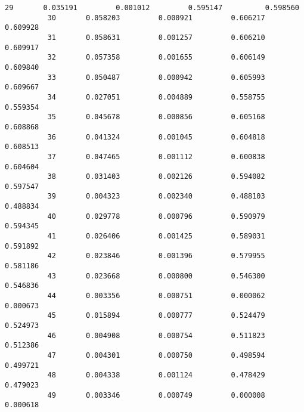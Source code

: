 \documentclass[11pt]{article}
\begin{document}
\begin{Verbatim}[commandchars=\\\{\}]
          29       0.035191         0.001012         0.595147          0.598560   
          30       0.058203         0.000921         0.606217          0.609928   
          31       0.058631         0.001257         0.606210          0.609917   
          32       0.057358         0.001655         0.606149          0.609840   
          33       0.050487         0.000942         0.605993          0.609667   
          34       0.027051         0.004889         0.558755          0.559354   
          35       0.045678         0.000856         0.605168          0.608868   
          36       0.041324         0.001045         0.604818          0.608513   
          37       0.047465         0.001112         0.600838          0.604604   
          38       0.031403         0.002126         0.594082          0.597547   
          39       0.004323         0.002340         0.488103          0.488834   
          40       0.029778         0.000796         0.590979          0.594345   
          41       0.026406         0.001425         0.589031          0.591892   
          42       0.023846         0.001396         0.579955          0.581186   
          43       0.023668         0.000800         0.546300          0.546836   
          44       0.003356         0.000751         0.000062          0.000673   
          45       0.015894         0.000777         0.524479          0.524973   
          46       0.004908         0.000754         0.511823          0.512386   
          47       0.004301         0.000750         0.498594          0.499721   
          48       0.004338         0.001124         0.478429          0.479023   
          49       0.003346         0.000749         0.000008          0.000618   
          

\end{Verbatim}
\end{document}
